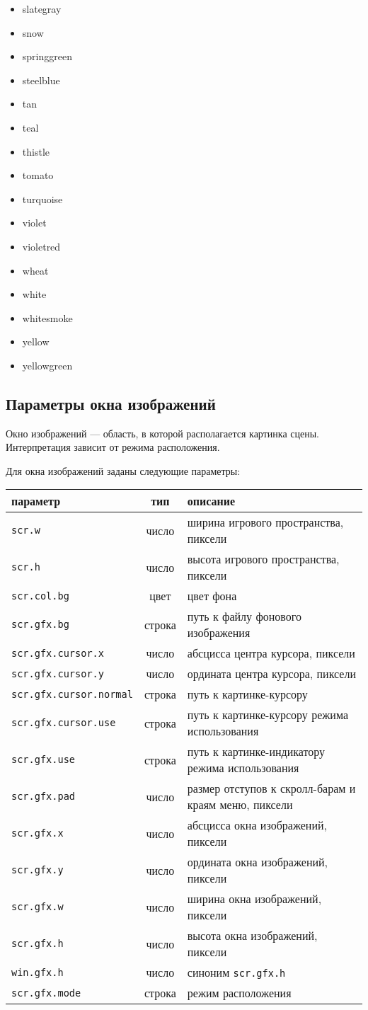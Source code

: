 \documentclass[a4paper,12pt]{article}
\begin{document}
\begin{itemize}
\item slategray
\item snow
\item springgreen
\item steelblue
\item tan
\item teal
\item thistle
\item tomato
\item turquoise
\item violet
\item violetred
\item wheat
\item white
\item whitesmoke
\item yellow
\item yellowgreen
\end{itemize}

\newpage

\subsection{Параметры окна изображений}

Окно изображений --- область, в которой располагается картинка сцены. Интерпретация зависит от режима расположения.

Для окна изображений заданы следующие параметры:\\

\newcommand{\tabParam}[3]{
\texttt{#1} & #2 & #3 \\
\hline
}

\begin{tabular}{|l|c|l|}
\hline
параметр & тип & описание \\
\hline
\tabParam{scr.w}{число}{ширина игрового пространства, пиксели}
\tabParam{scr.h}{число}{высота игрового пространства, пиксели}
\tabParam{scr.col.bg}{цвет}{цвет фона}
\tabParam{scr.gfx.bg}{строка}{путь к файлу фонового изображения}
\tabParam{scr.gfx.cursor.x}{число}{абсцисса центра курсора, пиксели}
\tabParam{scr.gfx.cursor.y}{число}{ордината центра курсора, пиксели}
\tabParam{scr.gfx.cursor.normal}{строка}{путь к картинке-курсору}
\tabParam{scr.gfx.cursor.use}{строка}{путь к картинке-курсору режима использования}
\tabParam{scr.gfx.use}{строка}{путь к картинке-индикатору режима использования}
\tabParam{scr.gfx.pad}{число}{размер отступов к скролл-барам и краям меню, пиксели}
\tabParam{scr.gfx.x}{число}{абсцисса окна изображений, пиксели}
\tabParam{scr.gfx.y}{число}{ордината окна изображений, пиксели}
\tabParam{scr.gfx.w}{число}{ширина окна изображений, пиксели}
\tabParam{scr.gfx.h}{число}{высота окна изображений, пиксели}
\tabParam{win.gfx.h}{число}{синоним \texttt{scr.gfx.h}}
\tabParam{scr.gfx.mode}{строка}{режим расположения}
\end{tabular}\\
\end{document}
